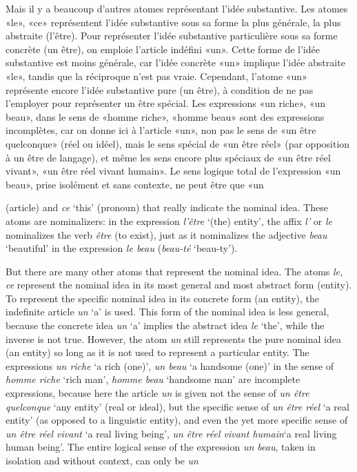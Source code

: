 \begin{sloppypar}
{  Mais il y a beaucoup d’autres atomes représentant l’idée
  substantive. Les atomes «le», «ce» représentent l’idée substantive
  sous sa forme la plus générale, la plus abstraite (l’être). Pour
  représenter l’idée substantive particulière sous sa forme concrète
  (un être), on emploie l’article indéfini «un». Cette forme de l’idée
  substantive est moins générale, car l’idée concrète «un» implique
  l’idée abstraite «le», tandis que la réciproque n’est pas
  vraie. Cependant, l’atome «un» représente encore l’idée substantive
  pure (un être), à condition de ne pas l’employer pour représenter un
  être spécial. Les expressions «un riche», «un beau», dans le sens de
  «homme riche», «homme beau» sont des expressions incomplètes, car on
  donne ici à l’article «un», non pas le sens de «un être quelconque»
  (réel ou idéel), mais le sens spécial de «un être réel» (par
  opposition à un être de langage), et même les sens encore plus
  spéciaux de «un être réel vivant», «un être réel vivant humain». Le
  sens logique total de l’expression «un beau», prise isolément et
  sans contexte, ne peut être que «un}%
{\noindent (article) and \emph{ce} `this' (pronoun) that really
  indicate the nominal idea.  These atoms are nominalizers: in the
  expression \emph{l'être} `(the) entity', the affix \emph{l'} or
  \emph{le} nominalizes the verb \emph{être} (to exist), just as it
  nominalizes the adjective \emph{beau} `beautiful' in the expression
  \emph{le beau} (\emph{beau-té} `beau-ty').

  But there are many other atoms that represent the nominal idea. The
  atoms \emph{le, ce} represent the nominal idea in its most general
  and most abstract form (entity). To represent the specific nominal
  idea in its concrete form (an entity), the indefinite article
  \emph{un} `a' is used. This form of the nominal idea is less
  general, because the concrete idea \emph{un} `a' implies the
  abstract idea \emph{le} `the', while the inverse is not
  true. However, the atom \emph{un} still represents the pure nominal
  idea (an entity) so long as it is not used to represent a particular
  entity. The expressions \emph{un riche} `a rich (one)', \emph{un
    beau} `a handsome (one)' in the sense of \emph{homme riche} `rich
  man', \emph{homme beau} `handsome man' are incomplete expressions,
  because here the article \emph{un} is given not the sense of
  \emph{un être quelconque} `any entity' (real or ideal), but the
  specific sense of \emph{un être réel} `a real entity' (as
  opposed to a linguistic entity), and even the yet more specific
  sense of \emph{un être réel vivant} `a real living being', \emph{un être réel vivant humain}`a
  real living human being'. The entire logical sense of the expression
  \emph{un beau}, taken in isolation and without context, can only be
  \emph{un} }


\end{sloppypar}
